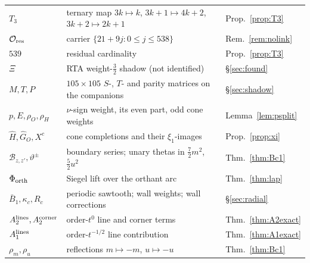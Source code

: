 \begin{center}
\begin{longtable}{p{3.2cm}p{9.3cm}p{2.4cm}}
$T_3$ & ternary map $3k\mapsto k$, $3k{+}1\mapsto4k{+}2$, $3k{+}2\mapsto2k{+}1$ & Prop.~\ref{prop:T3}\\
$\mathcal O_{\rm res}$ & carrier $\{21+9j:0\le j\le538\}$ & Rem.~\ref{rem:nolink}\\
$539$ & residual cardinality & Prop.~\ref{prop:T3}\\
$\Xi$ & RTA weight-$\frac32$ shadow (not identified) & \S\ref{sec:found}\\
$M,T,P$ & $105\times105$ $S$-, $T$- and parity matrices on the companions & \S\ref{sec:shadow}\\
$p,E,\rho_O,\rho_H$ & $\nu$-sign weight, its even part, odd cone weights & Lemma~\ref{lem:psplit}\\
$\widehat H,\widehat G_O,X^c$ & cone completions and their $\xi_1$-images & Prop.~\ref{prop:xi}\\
$\mathcal B_{z,z'},\vartheta^\pm$ & boundary series; unary thetas in $\frac72m^2$, $\frac52u^2$ & Thm.~\ref{thm:Bc1}\\
$\Phi_{\rm orth}$ & Siegel lift over the orthant arc & Thm.~\ref{thm:lap}\\
$\bar B_1,\kappa_c,R_c$ & periodic sawtooth; wall weights; wall corrections & \S\ref{sec:radial}\\
$A_2^{\rm lines},A_2^{\rm corner}$ & order-$t^0$ line and corner terms & Thm.~\ref{thm:A2exact}\\
$A_1^{\rm lines}$ & order-$t^{-1/2}$ line contribution & Thm.~\ref{thm:A1exact}\\
$\rho_m,\rho_u$ & reflections $m\mapsto-m$, $u\mapsto-u$ & Thm.~\ref{thm:Bc1}\\
\bottomrule
\end{longtable}
\end{center}
\clearpage
